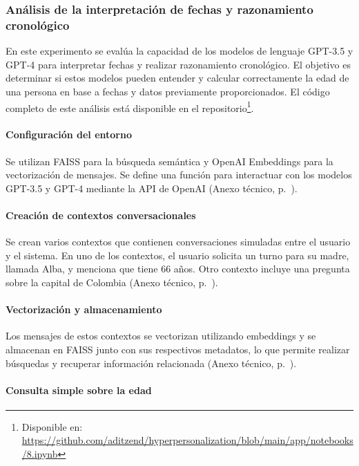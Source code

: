 \subsubsection{Análisis de la interpretación de fechas y razonamiento cronológico}

En este experimento se evalúa la capacidad de los modelos de lenguaje GPT-3.5 y GPT-4 para interpretar fechas y realizar razonamiento cronológico. El objetivo es determinar si estos modelos pueden entender y calcular correctamente la edad de una persona en base a fechas y datos previamente proporcionados. El código completo de este análisis está disponible en el repositorio\footnote{Disponible en: \url{https://github.com/aditzend/hyperpersonalization/blob/main/app/notebooks/8.ipynb}}.

\paragraph{Configuración del entorno}

Se utilizan FAISS para la búsqueda semántica y OpenAI Embeddings para la vectorización de mensajes. Se define una función para interactuar con los modelos GPT-3.5 y GPT-4 mediante la API de OpenAI (Anexo técnico, p.~\pageref{anexo:code-4-1-8-1}).

\paragraph{Creación de contextos conversacionales}

Se crean varios contextos que contienen conversaciones simuladas entre el usuario y el sistema. En uno de los contextos, el usuario solicita un turno para su madre, llamada Alba, y menciona que tiene 66 años. Otro contexto incluye una pregunta sobre la capital de Colombia (Anexo técnico, p.~\pageref{anexo:code-4-1-8-2}).

\paragraph{Vectorización y almacenamiento}

Los mensajes de estos contextos se vectorizan utilizando embeddings y se almacenan en FAISS junto con sus respectivos metadatos, lo que permite realizar búsquedas y recuperar información relacionada (Anexo técnico, p.~\pageref{anexo:code-4-1-8-3}).

\paragraph{Consulta simple sobre la edad}

